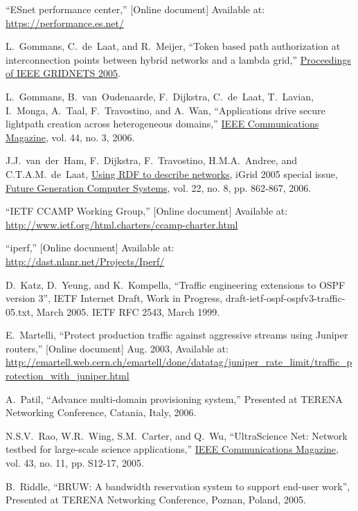 \documentclass[conference]{IEEEtran}
\begin{document}
\begin{thebibliography}{1}
``ESnet performance center,'' [Online document] Available at: \\
\url{https://performance.es.net/}

L.~Gommans, C.~de~Laat, and R.~Meijer,
``Token based path authorization at interconnection points between hybrid
networks and a lambda grid,''
\underline{Proceedings of IEEE GRIDNETS 2005}.

L.~Gommans, B.~van~Oudenaarde, F.~Dijkstra, C.~de~Laat, T.~Lavian, I.~Monga,
A.~Taal, F.~Travostino, and A.~Wan,
``Applications drive secure lightpath creation across heterogeneous domains,''
\underline{IEEE Communications Magazine},
vol. 44, no. 3, 2006.

J.J.~van~der~Ham, F.~Dijkstra, F.~Travostino, H.M.A.~Andree, and C.T.A.M.~de~Laat,
\underline{Using RDF to describe networks},
iGrid 2005 special issue,
\underline{Future Generation Computer Systems},
vol. 22, no. 8, pp. 862-867, 2006.

``IETF CCAMP Working Group,'' [Online document] Available at:
\url{http://www.ietf.org/html.charters/ccamp-charter.html}

``iperf,'' [Online document] Available at: \\
\url{http://dast.nlanr.net/Projects/Iperf/}

D.~Katz, D.~Yeung, and K.~Kompella,
``Traffic engineering extensions to OSPF version 3'',
IETF Internet Draft, Work in Progress,
draft-ietf-ospf-ospfv3-traffic-05.txt, March 2005.
IETF RFC 2543, March 1999.

E.~Martelli,
``Protect production traffic against aggressive streams using Juniper routers,''
[Online document] Aug. 2003, Available at:
\url{http://emartell.web.cern.ch/emartell/done/datatag/juniper_rate_limit/traffic_protection_with_juniper.html}

A.~Patil,
``Advance multi-domain provisioning system,''
Presented at TERENA Networking Conference, Catania, Italy, 2006.

N.S.V.~Rao, W.R.~Wing, S.M.~Carter, and Q.~Wu,
``UltraScience Net: Network testbed for large-scale science applications,''
\underline{IEEE Communications Magazine}, vol. 43, no. 11, pp. S12-17, 2005.

B.~Riddle,
``BRUW: A bandwidth reservation system to support end-user work'',
Presented at TERENA Networking Conference, Poznan, Poland, 2005.


\end{thebibliography}
\end{document}
